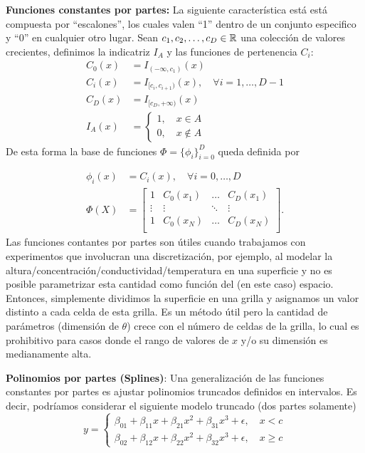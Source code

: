 \noindent\textbf{Funciones constantes por partes:} La siguiente característica está está compuesta por ``escalones'', los cuales valen ``1'' dentro de un conjunto especifico y ``0'' en cualquier otro lugar. Sean $c_1,c_2, \ldots,c_D\in\mathbb{R}$ una colección de valores crecientes, definimos la indicatriz $I_A$ y las funciones de pertenencia $C_i$:
\begin{align}
    C_0(x) &= I_{(-\infty,c_1)}(x)\\
    C_i(x) &= I_{[c_i,c_{i+1})}(x), \quad \forall i=1,\ldots,D-1\\
    C_D(x) &= I_{[c_D,+\infty)}(x)\\
    I_A(x) &= \left\{\begin{matrix}
    1,\quad x\in A\\
    0,\quad x\notin A
    \end{matrix}\right. 
\end{align}
De esta forma la base de funciones $\Phi=\{\phi_i\}_{i=0}^D$ queda definida por
    
\begin{align}
    \phi_i(x) &= C_i(x),\quad \forall i=0,\ldots,D\\
    \Phi(X) &= \left[ \begin{matrix}
    1 & C_0(x_1) & \ldots & C_D(x_1)\\
    \vdots & \vdots  & \ddots & \vdots \\
    1 & C_0(x_N) & \ldots & C_D(x_N)\\
    \end{matrix} \right].
\end{align}
Las funciones contantes por partes son útiles cuando trabajamos con experimentos que involucran una discretización, por ejemplo, al modelar la altura/concentración/conductividad/temperatura en una superficie y no es posible parametrizar esta cantidad como función del (en este caso) espacio. Entonces, simplemente dividimos la superficie en una grilla y asignamos un valor distinto a cada celda de esta grilla. Es un método útil pero la cantidad de parámetros (dimensión de $\theta$) crece con el número de celdas de la grilla, lo cual es prohibitivo para casos donde el  rango de valores de $x$ y/o su dimensión es medianamente alta. 
    
\iffalse
\noindent\textbf{Polinomios por partes (Splines)}: Una generalización de las funciones constantes por partes es ajustar polinomios truncados definidos en intervalos. Es decir, podríamos considerar el siguiente modelo truncado (dos partes solamente) 
\begin{equation}
    y = \left\{\begin{matrix}
    \beta_{01}+\beta_{11}x+\beta_{21}x^2+\beta_{31}x^3+\epsilon,\quad x < c\\
    \beta_{02}+\beta_{12}x+\beta_{22}x^2+\beta_{32}x^3+\epsilon,\quad x \geq c
    \end{matrix}\right.
\end{equation}
    
